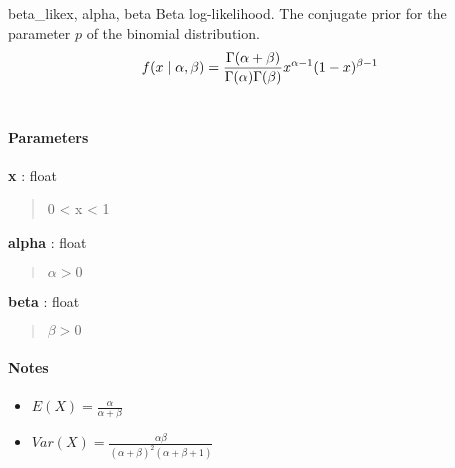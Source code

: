 \hypertarget{pymc.distributions.beta_like}{}
\begin{funcdesc}{beta\_like}{x, alpha, beta}
Beta log-likelihood. The conjugate prior for the parameter $p$ of the binomial distribution.
\begin{gather}
\begin{split}f(x \mid \alpha, \beta) = \frac{\Gamma(\alpha + \beta)}{\Gamma(\alpha) \Gamma(\beta)} x^{\alpha - 1} (1 - x)^{\beta - 1}\end{split}\notag\\\begin{split}\end{split}\notag
\end{gather}
\paragraph{Parameters}
\begin{paramlist}
\item[] \textbf{x} : float
\begin{quote}

0 \textless{} x \textless{} 1
\end{quote}

\item[] \textbf{alpha} : float
\begin{quote}
$\alpha>0$
\end{quote}

\item[] \textbf{beta} : float
\begin{quote}
$\beta>0$
\end{quote}
\end{paramlist}
\paragraph{Notes}
\begin{itemize}
\item {} 
$E(X)=\frac{\alpha}{\alpha+\beta}$

\item {} 
$Var(X)=\frac{\alpha \beta}{(\alpha+\beta)^2(\alpha+\beta+1)}$

\end{itemize}

\end{funcdesc}

